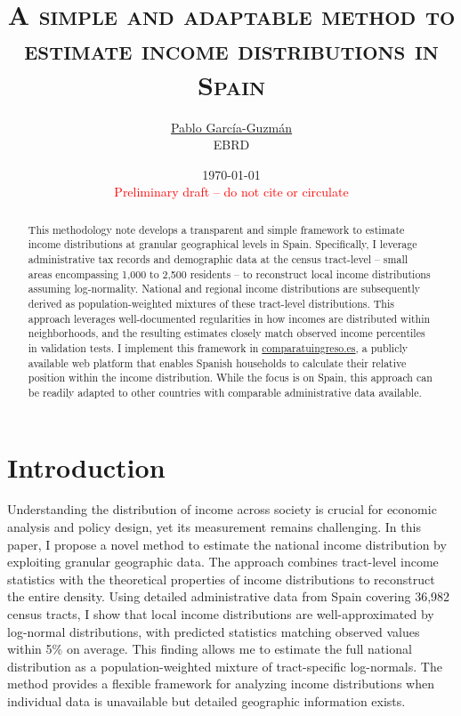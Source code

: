 \documentclass[letterpaper,11pt,leqno]{article}
\begin{document}
\title{\Large \textsc{A simple and adaptable method to estimate income distributions in Spain}}

\author{\href{https://pablogguz.github.io/}{\large{Pablo García-Guzmán}} \\ \normalsize{EBRD}}

\date{\normalsize \today \\ \textcolor{red}{Preliminary draft -- do not cite or circulate}}

\maketitle
\begin{abstract}
\onehalfspacing
This methodology note develops a transparent and simple framework to estimate income distributions at granular geographical levels in Spain. Specifically, I leverage administrative tax records and demographic data at the census tract-level -- small areas encompassing 1,000 to 2,500 residents -- to reconstruct local income distributions assuming log-normality. National and regional income distributions are subsequently derived as population-weighted mixtures of these tract-level distributions. This approach leverages well-documented regularities in how incomes are distributed within neighborhoods, and the resulting estimates closely match observed income percentiles in validation tests. I implement this framework in \href{https://comparatuingreso.es/}{comparatuingreso.es}, a publicly available web platform that enables Spanish households to calculate their relative position within the income distribution. While the focus is on Spain, this approach can be readily adapted to other countries with comparable administrative data available.
\end{abstract}

\thispagestyle{empty}

\newpage

\setcounter{page}{1}

\section{Introduction}

Understanding the distribution of income across society is crucial for economic analysis and policy design, yet its measurement remains challenging. In this paper, I propose a novel method to estimate the national income distribution by exploiting granular geographic data. The approach combines tract-level income statistics with the theoretical properties of income distributions to reconstruct the entire density. Using detailed administrative data from Spain covering 36,982 census tracts, I show that local income distributions are well-approximated by log-normal distributions, with predicted statistics matching observed values within 5\% on average. This finding allows me to estimate the full national distribution as a population-weighted mixture of tract-specific log-normals. The method provides a flexible framework for analyzing income distributions when individual data is unavailable but detailed geographic information exists.
\end{document}
